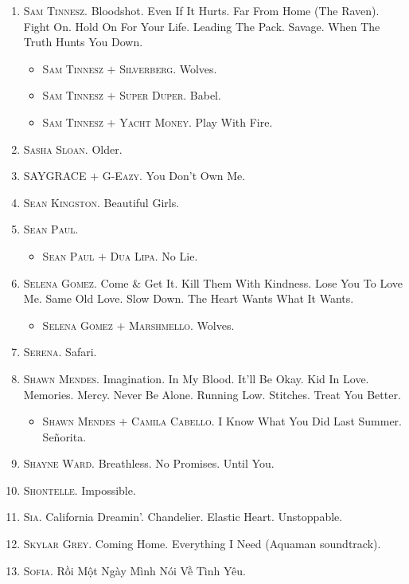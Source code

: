 \documentclass{article}
\numberwithin{equation}{section}
\begin{document}
\begin{enumerate}
	\item \textsc{Sam Tinnesz.} Bloodshot. Even If It Hurts. Far From Home (The Raven). Fight On. Hold On For Your Life. Leading The Pack. Savage. When The Truth Hunts You Down.
	\begin{itemize}
		\item \textsc{Sam Tinnesz $+$ Silverberg.} Wolves.
		\item \textsc{Sam Tinnesz $+$ Super Duper.} Babel.
		\item \textsc{Sam Tinnesz $+$ Yacht Money.} Play With Fire.
	\end{itemize}
	\item \textsc{Sasha Sloan.} Older.
	\item \textsc{SAYGRACE $+$ G-Eazy.} You Don't Own Me.
	\item \textsc{Sean Kingston.} Beautiful Girls.
	\item \textsc{Sean Paul.}
	\begin{itemize}
		\item \textsc{Sean Paul $+$ Dua Lipa.} No Lie.
	\end{itemize}
	\item \textsc{Selena Gomez.} Come \& Get It. Kill Them With Kindness. Lose You To Love Me. Same Old Love. Slow Down. The Heart Wants What It Wants.
	\begin{itemize}
		\item \textsc{Selena Gomez $+$ Marshmello.} Wolves.
	\end{itemize}
	\item \textsc{Serena.} Safari.
	\item \textsc{Shawn Mendes.} Imagination. In My Blood. It'll Be Okay. Kid In Love. Memories. Mercy. Never Be Alone. Running Low. Stitches. Treat You Better.
	\begin{itemize}
		\item \textsc{Shawn Mendes $+$ Camila Cabello.} I Know What You Did Last Summer. Se\~norita.
	\end{itemize}
	\item \textsc{Shayne Ward.} Breathless. No Promises. Until You.
	\item \textsc{Shontelle.} Impossible.
	\item \textsc{Sia.} California Dreamin'. Chandelier. Elastic Heart. Unstoppable.
	\item \textsc{Skylar Grey.} Coming Home. Everything I Need (Aquaman soundtrack).
	\item \textsc{Sofia.} Rồi Một Ngày Mình Nói Về Tình Yêu.
	\begin{itemize}

\end{itemize}
\end{enumerate}
\end{document}
